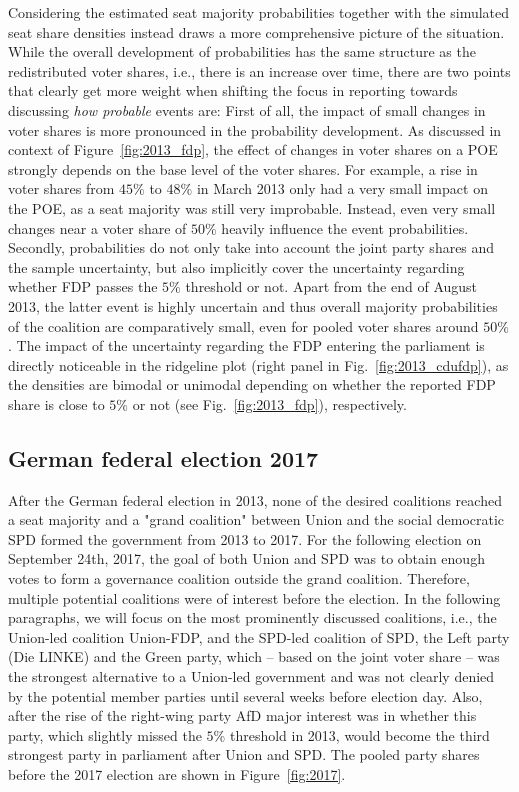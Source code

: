 \documentclass[smallcondensed]{svjour3}     %
\begin{document}
Considering the estimated seat majority probabilities together with
the simulated seat share densities instead draws a more comprehensive picture
of the situation.
While the overall development of probabilities has the same structure
as the redistributed voter shares, i.e., there is an increase over time,
there are two points that clearly get more weight when shifting
the focus in reporting towards discussing {\it how probable} events are:
First of all, the impact of small changes in voter shares is more pronounced
in the probability development. As discussed in context of
Figure~\ref{fig:2013_fdp}, the effect of changes in voter shares on
a POE strongly depends on the base level of the voter shares.
For example, a rise in voter shares from $45\%$ to $48\%$ in March 2013 only had a
very small impact on the POE, as a seat majority was still very improbable.
Instead, even very small changes near a voter share of $50\%$ heavily influence
the event probabilities. Secondly, probabilities do not only take into account
the joint party shares and the sample uncertainty,
but also implicitly cover the uncertainty regarding whether FDP passes the $5\%$
threshold or not. Apart from the end of August 2013, the latter event
is highly uncertain and thus overall majority probabilities of
the coalition are comparatively small, even for pooled voter shares around $50\%$.
The impact of the uncertainty regarding the FDP entering the parliament is
directly noticeable in the ridgeline plot (right panel in Fig.~\ref{fig:2013_cdufdp}),
as the densities are bimodal or unimodal depending on whether the reported FDP
share is close to $5\%$ or not (see Fig.~\ref{fig:2013_fdp}), respectively.



\subsection{German federal election 2017} \label{subsec:2017}
After the German federal election in 2013, none of the desired coalitions
reached a seat majority and a "grand coalition" between Union and the social
democratic SPD formed the government from 2013 to 2017.
For the following election on September 24th, 2017, the goal of both Union and SPD
was to obtain enough votes to form a governance coalition outside the grand
coalition. Therefore, multiple potential coalitions were of interest before the
election. In the following paragraphs, we will focus on the most prominently
discussed coalitions, i.e., the Union-led coalition Union-FDP, and the
SPD-led coalition of SPD, the Left party (Die LINKE) and the Green party, which
-- based on the joint voter share -- was the strongest alternative to a Union-led
government and was not clearly denied by the potential member parties until several weeks
before election day.
Also, after the rise of the right-wing party AfD major interest was
in whether this party, which slightly missed the $5\%$ threshold in 2013,
would become the third strongest party in parliament after Union and SPD.
The pooled party shares before the 2017 election are shown in Figure~\ref{fig:2017}.
\end{document}
